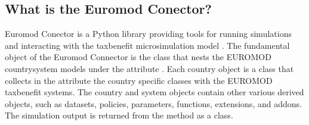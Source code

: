 \documentclass[letterpaper,10pt,english]{sphinxmanual}
\begin{document}
\subsection{What is the Euromod Conector?}
\label{\detokenize{userguide:what-is-the-euromod-conector}}
\sphinxAtStartPar
Euromod Conector is a Python library providing tools for running simulations and interacting with the tax\sphinxhyphen{}benefit microsimulation model .
The fundamental object of the Euromod Connector is the  class that nests the EUROMOD country\sphinxhyphen{}system models under the attribute . Each country object is a  class that collects in the  attribute the country specific  classes with the EUROMOD tax\sphinxhyphen{}benefit systems. The country and system objects contain other various derived objects, such as datasets, policies, parameters, functions, extensions, and add\sphinxhyphen{}ons.
The simulation output is returned from the  method as a  class.
\end{document}
